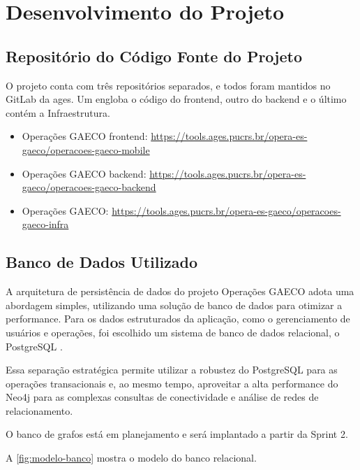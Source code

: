 \section[Desenvolvimento do Projeto]{Desenvolvimento do Projeto}

\subsection{Repositório do Código Fonte do Projeto}
  O projeto conta com três repositórios separados, e todos foram mantidos no GitLab da \ac{ages}. Um engloba o código do frontend, outro do backend e o último contém a Infraestrutura.
  
    \begin{itemize}
      \item Operações GAECO frontend: \url{https://tools.ages.pucrs.br/opera-es-gaeco/operacoes-gaeco-mobile}
      \item Operações GAECO backend: \url{https://tools.ages.pucrs.br/opera-es-gaeco/operacoes-gaeco-backend}
      \item Operações GAECO: \url{https://tools.ages.pucrs.br/opera-es-gaeco/operacoes-gaeco-infra}
    \end{itemize}

\subsection{Banco de Dados Utilizado}
  A arquitetura de persistência de dados do projeto Operações GAECO adota uma abordagem simples, utilizando uma solução de banco de dados para otimizar a performance. Para os dados estruturados da aplicação, como o gerenciamento de usuários e operações, foi escolhido um sistema de banco de dados relacional, o PostgreSQL \cite{postgresql}.

  Essa separação estratégica permite utilizar a robustez do PostgreSQL para as operações transacionais e, ao mesmo tempo, aproveitar a alta performance do Neo4j para as complexas consultas de conectividade e análise de redes de relacionamento.
  
  O banco de grafos está em planejamento e será implantado a partir da Sprint 2.

  A \autoref{fig:modelo-banco} mostra o modelo do banco relacional.

